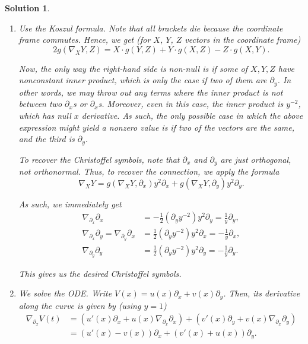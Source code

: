 \documentclass{article}
\theoremstyle{plain}
\theoremstyle{nonumberplain}
\newtheorem{sol}{Solution}
\begin{document}
\begin{sol}
\leavevmode
\begin{enumerate}
\item Use the Koszul formula. Note that all brackets die because the coordinate frame commutes. Hence, we get (for $X$, $Y$, $Z$ vectors in the coordinate frame)
\begin{equation}
2 g(\nabla_X Y, Z) = X \cdot g(Y,Z) + Y \cdot g(X,Z) - Z \cdot g(X,Y).
\end{equation}

Now, the only way the right-hand side is non-null is if some of $X, Y, Z$ have nonconstant inner product, which is only the case if two of them are $\partial_y$. In other words, we may throw out any terms where the inner product is not between two $\partial_x$s or $\partial_x$s. Moreover, even in this case, the inner product is $y^{-2}$, which has null $x$ derivative. As such, the \emph{only} possible case in which the above expression might yield a nonzero value is if two of the vectors are the same, and the third is $\partial_y$.

To recover the Christoffel symbols, note that $\partial_x$ and $\partial_y$ are just orthogonal, not orthonormal. Thus, to recover the connection, we apply the formula
\begin{equation}
\nabla_X Y = g(\nabla_X Y, \partial_x) y^2 \partial_x + g(\nabla_X Y, \partial_y) y^2 \partial_y.
\end{equation}

As such, we immediately get
\begin{equation}
\begin{aligned}
\nabla_{\partial_x} \partial_x &= -\frac12 (\partial_y y^{-2}) y^2 \partial_y = \frac1y \partial_y,\\
\nabla_{\partial_x} \partial_y = \nabla_{\partial_y} \partial_x &= \frac12 (\partial_y y^{-2}) y^2 \partial_x = -\frac1y \partial_x,\\
\nabla_{\partial_y} \partial_y &= \frac12 (\partial_y y^{-2}) y^2 \partial_y = - \frac1y \partial_y.
\end{aligned}
\end{equation}

This gives us the desired Christoffel symbols.

\item We solve the ODE. Write $V(x) = u(x) \partial_x + v(x) \partial_y$. Then, its derivative along the curve is given by (using $y = 1$)
\begin{equation}
\begin{aligned}
\nabla_{\partial_x} V(t) &= (u'(x) \partial_x + u(x) \nabla_{\partial_x} \partial_x) + (v'(x) \partial_y + v(x) \nabla_{\partial_x} \partial_y)\\
&= (u'(x) - v(x)) \partial_x + (v'(x) + u(x)) \partial_y.
\end{aligned}
\end{equation}


\end{enumerate}
\end{sol}
\end{document}
